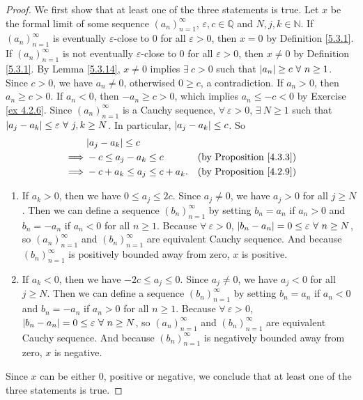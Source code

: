 \begin{proof}
We first show that at least one of the three statements is true.
Let \(x\) be the formal limit of some sequence \((a_n)_{n = 1}^{\infty}\), \(\varepsilon, c \in \mathds{Q}\) and \(N, j, k \in \mathds{N}\).
If \((a_n)_{n = 1}^{\infty}\) is eventually \(\varepsilon\)-close to \(0\) for all \(\varepsilon > 0\), then \(x = 0\) by Definition \ref{5.3.1}.
If \((a_n)_{n = 1}^{\infty}\) is not eventually \(\varepsilon\)-close to \(0\) for all \(\varepsilon > 0\), then \(x \neq 0\) by Definition \ref{5.3.1}.
By Lemma \ref{5.3.14}, \(x \neq 0\) implies \(\exists\ c > 0\) such that \(\abs*{a_n} \geq c \ \forall\ n \geq 1\).
Since \(c > 0\), we have \(a_n \neq 0\), otherwised \(0 \geq c\), a contradiction.
If \(a_n > 0\), then \(a_n \geq c > 0\).
If \(a_n < 0\), then \(-a_n \geq c > 0\), which implies \(a_n \leq -c < 0\) by Exercise \ref{ex 4.2.6}.
Since \((a_n)_{n = 1}^{\infty}\) is a Cauchy sequence, \(\forall\ \varepsilon > 0\), \(\exists\ N \geq 1\) such that \(\abs*{a_j - a_k} \leq \varepsilon \ \forall\ j, k \geq N\).
In particular, \(\abs*{a_j - a_k} \leq c\).
So
\begin{align*}
& \abs*{a_j - a_k} \leq c \\
\implies & -c \leq a_j - a_k \leq c & \text{(by Proposition \ref{4.3.3})} \\
\implies & -c + a_k \leq a_j \leq c + a_k. & \text{(by Proposition \ref{4.2.9})} \\
\end{align*}
\begin{enumerate}[label=(\roman*)]
    \item If \(a_k > 0\), then we have \(0 \leq a_j \leq 2c\).
    Since \(a_j \neq 0\), we have \(a_j > 0\) for all \(j \geq N\).
    Then we can define a sequence \((b_n)_{n = 1}^{\infty}\) by setting \(b_n = a_n\) if \(a_n > 0\) and \(b_n = -a_n\) if \(a_n < 0\) for all \(n \geq 1\).
    Because \(\forall\ \varepsilon > 0\), \(\abs*{b_n - a_n} = 0 \leq \varepsilon \ \forall\ n \geq N\), so \((a_n)_{n = 1}^{\infty}\) and \((b_n)_{n = 1}^{\infty}\) are equivalent Cauchy sequence.
    And because \((b_n)_{n = 1}^{\infty}\) is positively bounded away from zero, \(x\) is positive.
    \item If \(a_k < 0\), then we have \(-2c \leq a_j \leq 0\).
    Since \(a_j \neq 0\), we have \(a_j < 0\) for all \(j \geq N\).
    Then we can define a sequence \((b_n)_{n = 1}^{\infty}\) by setting \(b_n = a_n\) if \(a_n < 0\) and \(b_n = -a_n\) if \(a_n > 0\) for all \(n \geq 1\).
    Because \(\forall\ \varepsilon > 0\), \(\abs*{b_n - a_n} = 0 \leq \varepsilon \ \forall\ n \geq N\), so \((a_n)_{n = 1}^{\infty}\) and \((b_n)_{n = 1}^{\infty}\) are equivalent Cauchy sequence.
    And because \((b_n)_{n = 1}^{\infty}\) is negatively bounded away from zero, \(x\) is negative.
\end{enumerate}
Since \(x\) can be either \(0\), positive or negative, we conclude that at least one of the three statements is true.


\end{proof}
